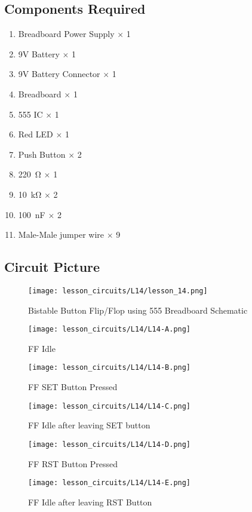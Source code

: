 \subsection{Components Required}
\begin{enumerate}
    \item Breadboard Power Supply $\times$ 1
    \item 9V Battery $\times$ 1
    \item 9V Battery Connector $\times$ 1
    \item Breadboard $\times$ 1
    \item 555 IC $\times$ 1
    \item Red LED $\times$ 1
    \item Push Button $\times$ 2
    \item \SI{220}{\ohm} $\times$ 1
    \item \SI{10}{\kilo\ohm} $\times$ 2
    \item \SI{100}{\nano\farad} $\times$ 2
    \item Male-Male jumper wire $\times$ 9
\end{enumerate}
\subsection{Circuit Picture}
\begin{figure}[!h]
    \centering
    \texttt{[image: lesson\_circuits/L14/lesson\_14.png]}
    \caption{Bistable Button Flip/Flop using 555 Breadboard Schematic}
    \label{fig:555_ff_sch}
\end{figure}
\begin{figure}[!h]
    \centering
    \texttt{[image: lesson\_circuits/L14/L14-A.png]}
    \caption{FF Idle}
    \label{fig:555_ff_obb}
\end{figure}
\begin{figure}[!h]
    \centering
    \texttt{[image: lesson\_circuits/L14/L14-B.png]}
    \caption{FF SET Button Pressed}
    \label{fig:555_ff_obb1}
\end{figure}
\begin{figure}[!h]
    \centering
    \texttt{[image: lesson\_circuits/L14/L14-C.png]}
    \caption{FF Idle after leaving SET button}
    \label{fig:555_ff_obb2}
\end{figure}
\begin{figure}[!h]
    \centering
    \texttt{[image: lesson\_circuits/L14/L14-D.png]}
    \caption{FF RST Button Pressed}
    \label{fig:555_ff_obb3}
\end{figure}
\begin{figure}[!h]
    \centering
    \texttt{[image: lesson\_circuits/L14/L14-E.png]}
    \caption{FF Idle after leaving RST Button}
    \label{fig:555_ff_obb4}
\end{figure}
